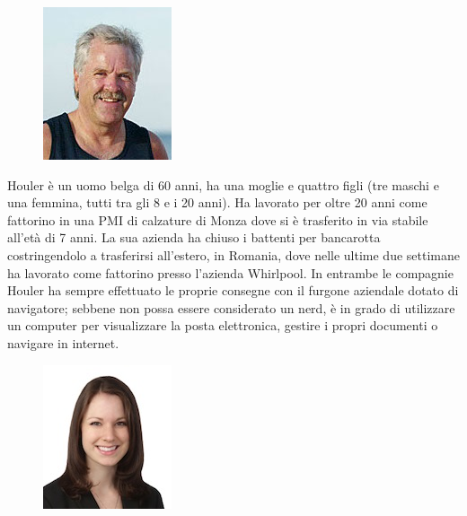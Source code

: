 \documentclass[12pt,a4paper,openright, notitlepage]{report}
\begin{document}
\begin{figure}
  \vspace{-30pt}
  \begin{center}
    \includegraphics{imgs/houler.jpg}
  \end{center}
  \vspace{-30pt}
\end{figure}

Houler è un uomo belga di 60 anni, ha una moglie e quattro figli (tre maschi e una femmina, tutti tra gli 8 e i 20 anni). Ha lavorato per oltre 20 anni come fattorino in una PMI di calzature di Monza dove si è trasferito in via stabile all’età di 7 anni. La sua azienda ha chiuso i battenti per bancarotta costringendolo a trasferirsi all’estero, in Romania, dove nelle ultime due settimane ha lavorato come fattorino presso l’azienda Whirlpool. In entrambe le compagnie Houler ha sempre effettuato le proprie consegne con il furgone aziendale dotato di navigatore; sebbene non possa essere considerato un nerd, è in grado di utilizzare un computer per visualizzare la posta elettronica, gestire i propri documenti o navigare in internet.

\begin{figure}
  \vspace{-30pt}
  \begin{center}
    \includegraphics{imgs/veronica.jpg}
  \end{center}
  \vspace{-30pt}
\end{figure}

\newpage
\end{document}
